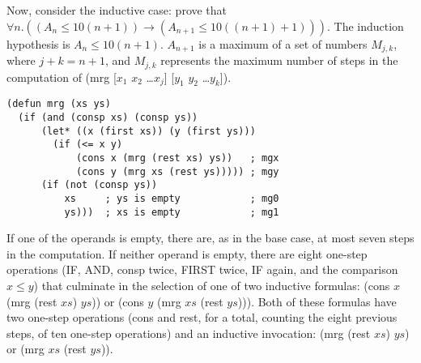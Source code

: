 Now, consider the inductive case:
prove that $\forall n.((A_n \leq 10(n+1)) \rightarrow (A_{n+1} \leq 10((n+1) + 1)))$.
The induction hypothesis is $A_n \leq 10(n + 1)$.
$A_{n+1}$ is a maximum of a set of numbers $M_{j,k}$, where $j + k = n+1$,
and $M_{j,k}$ represents the maximum number of steps in the computation of
(mrg [$x_1$ $x_2$ \dots $x_j$] [$y_1$ $y_2$ \dots $y_k$]).

\label{defun:mrg-copy}
\begin{Verbatim}
(defun mrg (xs ys)
  (if (and (consp xs) (consp ys))
      (let* ((x (first xs)) (y (first ys)))
        (if (<= x y)
            (cons x (mrg (rest xs) ys))   ; mgx
            (cons y (mrg xs (rest ys))))) ; mgy
      (if (not (consp ys))
          xs     ; ys is empty            ; mg0
          ys)))  ; xs is empty            ; mg1
\end{Verbatim}

If one of the operands is empty, there are, as in the base case,
at most seven steps in the computation.
If neither operand is empty, there are eight one-step operations
(IF, AND, consp twice, FIRST twice, IF again, and the comparison $x \leq y$)
that culminate in the selection of
one of two inductive formulas: (cons $x$ (mrg (rest $xs$) $ys$))
or (cons $y$ (mrg $xs$ (rest $ys$))).
Both of these formulas have two one-step operations (cons and rest,
for a total, counting the eight previous steps, of ten one-step operations)
and an inductive invocation:
(mrg (rest $xs$) $ys$) or (mrg $xs$ (rest $ys$)).

